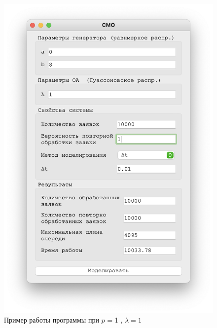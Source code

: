\begin{figure}[!htb]
\begin{minipage}{0.55\textwidth}
      \includegraphics[width=1\linewidth]{1-1-t}
    \end{minipage}
    \caption{Пример работы программы при $p$ = 1 , $\lambda = 1$}
 \end{figure}



